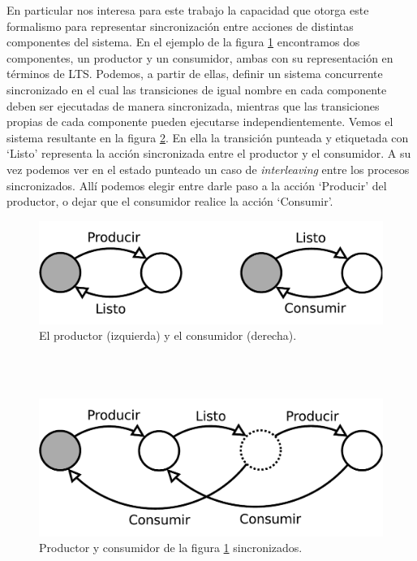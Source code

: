 \documentclass[pdftex,a4paper,12pt]{book}
\begin{document}
En particular nos interesa para este trabajo la capacidad que otorga este formalismo para representar sincronizaci\'on entre acciones de distintas componentes del sistema. En el ejemplo de la figura \ref{figura1} encontramos dos componentes, un productor y un consumidor, ambas con su representaci\'on en t\'erminos de LTS. Podemos, a partir de ellas, definir un sistema concurrente sincronizado en el cual las transiciones de igual nombre en cada componente deben ser ejecutadas de manera sincronizada, mientras que las transiciones propias de cada componente pueden ejecutarse independientemente. Vemos el sistema resultante en la figura \ref{figura2}. En ella la transici\'on punteada y etiquetada con `Listo' representa la acci\'on sincronizada entre el productor y el consumidor. A su vez podemos ver en el estado punteado un caso de \emph{interleaving} entre los procesos sincronizados. All\'i podemos elegir entre darle paso a la acci\'on `Producir' del productor, o dejar que el consumidor realice la acci\'on `Consumir'. 

\begin{figure}[htp] %
  \centering
    \includegraphics[scale=0.75]{Imagenes/prodYcons.pdf}
  \caption{El productor (izquierda) y el consumidor (derecha).}
  \label{figura1}
\end{figure}
~\\\\

\begin{figure}[htp] %
  \centering
    \includegraphics[scale=0.75]{Imagenes/prodYconsSincro.pdf}
  \caption{Productor y consumidor de la figura \ref{figura1} sincronizados.}
  \label{figura2}
\end{figure}
\end{document}
